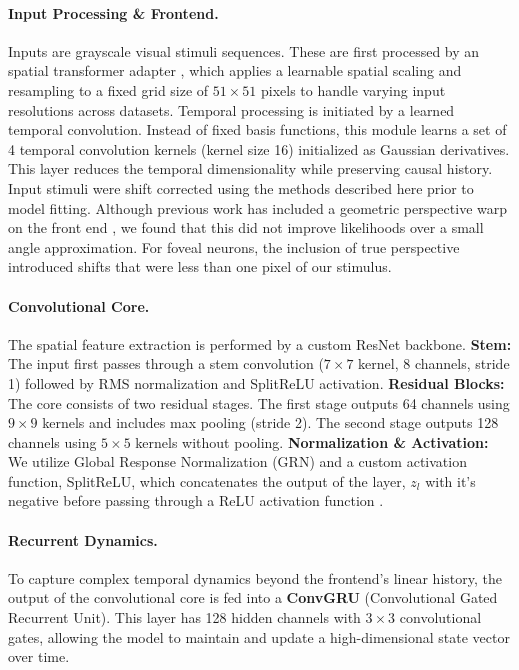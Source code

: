 \documentclass{lite}
\begin{document}
\paragraph{Input Processing \& Frontend.} Inputs are grayscale visual stimuli sequences. These are first processed by an spatial transformer adapter \cite{jaderberg2015spatial}, which applies a learnable spatial scaling and resampling to a fixed grid size of $51 \times 51$ pixels to handle varying input resolutions across datasets. Temporal processing is initiated by a learned temporal convolution. Instead of fixed basis functions, this module learns a set of 4 temporal convolution kernels (kernel size 16) initialized as Gaussian derivatives. This layer reduces the temporal dimensionality while preserving causal history. Input stimuli were shift corrected using the methods described here \cite{yates2023detailed} prior to model fitting. Although previous work has included a geometric perspective warp on the front end \cite{wang2025foundation}, we found that this did not improve likelihoods over a small angle approximation. For foveal neurons, the inclusion of true perspective introduced shifts that were less than one pixel of our stimulus.

\paragraph{Convolutional Core.} The spatial feature extraction is performed by a custom ResNet backbone. \textbf{Stem:} The input first passes through a stem convolution ($7 \times 7$ kernel, 8 channels, stride 1) followed by RMS normalization and SplitReLU activation. \textbf{Residual Blocks:} The core consists of two residual stages. The first stage outputs 64 channels using $9 \times 9$ kernels and includes max pooling (stride 2). The second stage outputs 128 channels using $5 \times 5$ kernels without pooling. \textbf{Normalization \& Activation:} We utilize Global Response Normalization (GRN) \cite{woo2023convnext} and a custom activation function, SplitReLU, which concatenates the output of the layer, $z_l$ with it's negative before passing through a ReLU activation function \cite{shang2016understanding}.

\paragraph{Recurrent Dynamics.} To capture complex temporal dynamics beyond the frontend's linear history, the output of the convolutional core is fed into a \textbf{ConvGRU} (Convolutional Gated Recurrent Unit). This layer has 128 hidden channels with $3 \times 3$ convolutional gates, allowing the model to maintain and update a high-dimensional state vector over time.
\end{document}

